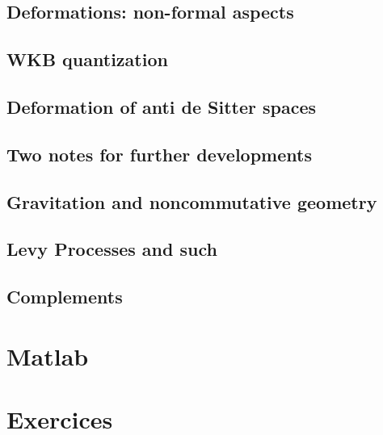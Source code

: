 \documentclass[a4paper,twoside,11pt]{book}
\begin{document}
\chapter{Deformations: non-formal aspects}


      

\chapter{WKB quantization}


\chapter{Deformation of anti de Sitter spaces}   \label{ChDefoBH}


\chapter{Two notes for further developments}        \label{ChapNoteDev}



\chapter{Gravitation and noncommutative geometry}


\chapter{Levy Processes and such}


\chapter{Complements}









\emptyInputPath
{}

\part{Matlab}




\emptyInputPath
{}
\part{Exercices} 
\end{document}
